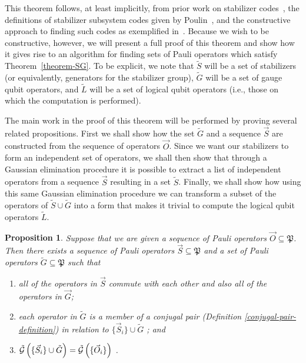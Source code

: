 \documentclass[twocolumn,showpacs,preprintnumbers,amsmath,amssymb,nofootinbib,pra,floatfix]{revtex4-1}
\newtheorem{proposition}{Proposition}
\newenvironment{remark}[1][Remark]{\begin{trivlist}
\item[\hskip \labelsep {\bfseries #1}]}{\end{trivlist}}
\newcommand{\lst}{\vec}
\newcommand{\set}{\tilde}
\newcommand{\genfun}{\tilde{\mathcal{G}}}
\newcommand{\pauligroup}{\mathfrak{P}}
\begin{document}
\begin{remark}
This theorem follows, at least implicitly, from prior work on stabilizer codes~\cite{Gottesman:97a}, the definitions of stabilizer subsystem codes given by Poulin~\cite{Poulin:05a}, and the constructive approach to finding such codes as exemplified in~\cite{Bacon:06a}.  Because we wish to be constructive, however, we will present a full proof of this theorem and show how it gives rise to an algorithm for finding sets of Pauli operators which satisfy Theorem~\ref{theorem-SG}.  To be explicit, we note that $\set S$ will be a set of stabilizers (or equivalently, generators for the stabilizer group), $\set G$ will be a set of gauge qubit operators, and $\set L$ will be a set of logical qubit operators (i.e., those on which the computation is performed).

The main work in the proof of this theorem will be performed by proving several related propositions.  First we shall show how the set $\set G$ and a sequence $\lst S$ are constructed from the sequence of operators $\lst O$.  Since we want our stabilizers to form an independent set of operators, we shall then show that through a Gaussian elimination procedure it is possible to extract a list of independent operators from a sequence $\lst S$ resulting in a set $\set S$.  Finally, we shall show how using this same Gaussian elimination procedure we can transform a subset of the operators of $\set S\cup\set G$ into a form that makes it trivial to compute the logical qubit operators $\set L$.
\end{remark}
\begin{proposition} \label{proposition-SG} Suppose that we are given a sequence of Pauli operators $\lst O\subseteq \pauligroup$.  Then there exists a sequence of Pauli operators $\lst S\subseteq\pauligroup$ and a set of Pauli operators $\set G\subseteq\pauligroup$ such that
\begin{enumerate}
\item all of the operators in $\lst S$ commute with each other and also all of the operators in $\lst G$; \label{stabs-commute-with-G}
\item each operator in $\set G$ is a member of a \emph{conjugal pair} (Definition \ref{conjugal-pair-definition}) in relation to $\{\lst S_i\} \cup \set G $ \label{conjugal-pairs-commute-with-SAG}; and
\item $\genfun\paren{\{\lst S_i\}\cup \set G}=\genfun\paren{\{\lst O_i\}}$ \label{SAG-spans-all}.
\end{enumerate}
\end{proposition}
\end{document}
